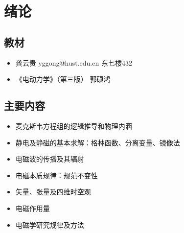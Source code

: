 \chapter{绪论}

\section{教材}

\begin{itemize}
\item 龚云贵 yggong@hust.edu.cn 东七楼432
\item 《电动力学》（第三版） 郭硕鸿
\end{itemize}

\section{主要内容}

\begin{itemize}
\item 麦克斯韦方程组的逻辑推导和物理内涵
\item 静电及静磁的基本求解：格林函数、分离变量、镜像法
\item 电磁波的传播及其辐射
\item 电磁本质规律：规范不变性
\item 矢量、张量及四维时空观
\item 电磁作用量
\item 电磁学研究规律及方法
\end{itemize}



